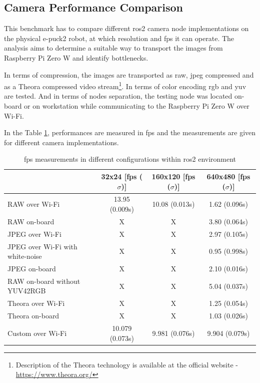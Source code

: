 \subsection{Camera Performance Comparison}
This benchmark has to compare different \ac{ros2} camera node implementations on the physical e-puck2 robot, at which resolution and \ac{fps} it can operate.
The analysis aims to determine a suitable way to transport the images from Raspberry Pi Zero W and identify bottlenecks.

In terms of compression, the images are transported as raw, \ac{jpeg} compressed and as a Theora compressed video stream\footnote{Description of the Theora technology is available at the official website - \url{https://www.theora.org/}}.
In terms of color encoding \ac{rgb} and \acs{yuv} are tested.
And in terms of nodes separation, the testing node was located on-board or on workstation while communicating to the Raspberry Pi Zero W over Wi-Fi.

In the Table \ref{tab:results:camera_perf}, performances are measured in \ac{fps} and the measurements are given for different camera implementations.

\begin{table}[H]
    \begin{adjustwidth}{-1.5in}{-1.5in} 
    \centering
    \begin{tabular}{|l|c|c|c|}
        \hline
         & 32x24 [\ac{fps} ($ \sigma $)] & 160x120 [\ac{fps} ($ \sigma $)] & 640x480 [\ac{fps} ($ \sigma $)] \\
         \hline
         RAW over Wi-Fi & 13.95 (0.009s) & 10.08 (0.013s) & 1.62 (0.096s) \\
         \hline
         RAW on-board & X & X & 3.80 (0.064s) \\
        \hline
        JPEG over Wi-Fi & X & X & 2.97 (0.105s) \\
        \hline
        JPEG over Wi-Fi with white-noise & X & X & 0.95 (0.998s) \\
        \hline
        JPEG on-board & X & X & 2.10 (0.016s) \\
        \hline
        RAW on-board without YUV42RGB & X & X & 5.04 (0.037s) \\
        \hline
        Theora over Wi-Fi & X & X & 1.25 (0.054s) \\
        \hline
        Theora on-board & X & X & 1.03 (0.026s) \\
        \hline
        Custom over Wi-Fi & 10.079 (0.073s) & 9.981 (0.076s) & 9.904 (0.079s) \\
        \hline
    \end{tabular}
    \end{adjustwidth}
    
    \caption{\ac{fps} measurements in different configurations within \ac{ros2} environment}
    \label{tab:results:camera_perf}
\end{table}

